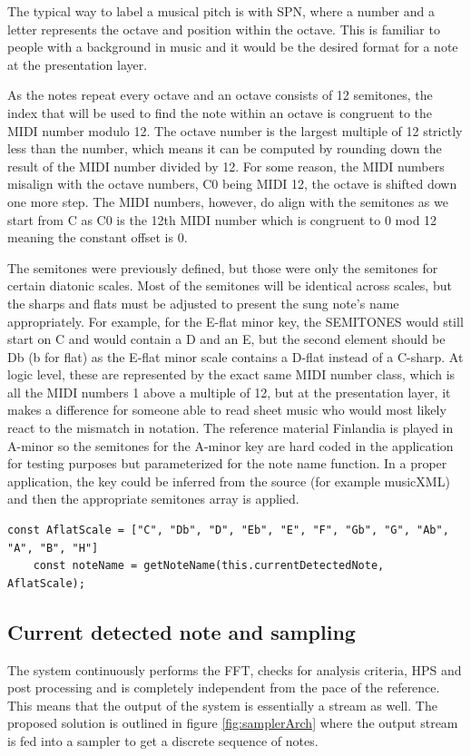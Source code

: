 The typical way to label a musical pitch is with SPN, where a number and a letter represents the octave and position within the octave. This is familiar to people with a background in music and it would be the desired format for a note at the presentation layer.

As the notes repeat every octave and an octave consists of 12 semitones, the index that will be used to find the note within an octave is congruent to the MIDI number modulo 12. The octave number is the largest multiple of 12 strictly less than the number, which means it can be computed by rounding down the result of the MIDI number divided by 12. For some reason, the MIDI numbers misalign with the octave numbers, C0 being MIDI 12, the octave is shifted down one more step. The MIDI numbers, however, do align with the semitones as we start from C as C0 is the 12th MIDI number which is congruent to 0 mod 12 meaning the constant offset is 0.



The semitones were previously defined, but those were only the semitones for certain diatonic scales. Most of the semitones will be identical across scales, but the sharps and flats must be adjusted to present the sung note's name appropriately. For example, for the E-flat minor key, the SEMITONES would still start on C and would contain a D and an E, but the second element should be Db (b for flat) as the E-flat minor scale contains a D-flat instead of a C-sharp. At logic level, these are represented by the exact same MIDI number class, which is all the MIDI numbers 1 above a multiple of 12, but at the presentation layer, it makes a difference for someone able to read sheet music who would most likely react to the mismatch in notation. The reference material Finlandia is played in A-minor so the semitones for the A-minor key are hard coded in the application for testing purposes but parameterized for the note name function. In a proper application, the key could be inferred from the source (for example musicXML) and then the appropriate semitones array is applied.

\begin{lstlisting}[style=javascript]
    const AflatScale = ["C", "Db", "D", "Eb", "E", "F", "Gb", "G", "Ab", "A", "B", "H"]
    const noteName = getNoteName(this.currentDetectedNote, AflatScale);
\end{lstlisting}

\subsection{Current detected note and sampling}
The system continuously performs the FFT, checks for analysis criteria, HPS and post processing and is completely independent from the pace of the reference. This means that the output of the system is essentially a stream as well. The proposed solution is outlined in figure \ref{fig:samplerArch} where the output stream is fed into a sampler to get a discrete sequence of notes. 

